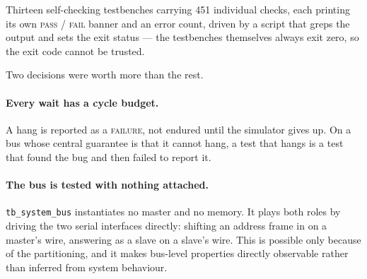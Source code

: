 \documentclass[11pt,a4paper]{article}
\newcommand{\sig}[1]{\texttt{#1}}
\begin{document}
Thirteen self-checking testbenches carrying 451 individual checks, each
printing its own \textsc{pass} / \textsc{fail} banner and an error count,
driven by a script that greps the output and sets the exit status --- the
testbenches themselves always exit zero, so the exit code cannot be trusted.

Two decisions were worth more than the rest.

\paragraph{Every wait has a cycle budget.} A hang is reported as a
\textsc{failure}, not endured until the simulator gives up. On a bus whose
central guarantee is that it cannot hang, a test that hangs is a test that
found the bug and then failed to report it.

\paragraph{The bus is tested with nothing attached.} \sig{tb\_system\_bus}
instantiates no master and no memory. It plays both roles by driving the two
serial interfaces directly: shifting an address frame in on a master's wire,
answering as a slave on a slave's wire. This is possible only because of the
partitioning, and it makes bus-level properties directly observable rather
than inferred from system behaviour.
\end{document}

